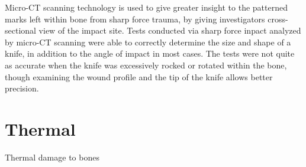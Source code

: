 \documentclass[titlepage]{article}
\begin{document}
Micro-CT scanning technology is used to give greater insight to the patterned marks left within bone from sharp force trauma, by giving investigators cross-sectional view of the impact site. Tests conducted via sharp force inpact analyzed by micro-CT scanning were able to correctly determine the size and shape of a knife, in addition to the angle of impact in most cases. The tests were not quite as accurate when the knife was excessively rocked or rotated within the bone, though examining the wound profile and the tip of the knife allows better precision.\cite{micro-ct}

\newpage
\section{Thermal}
Thermal damage to bones

\newpage

\end{document}
